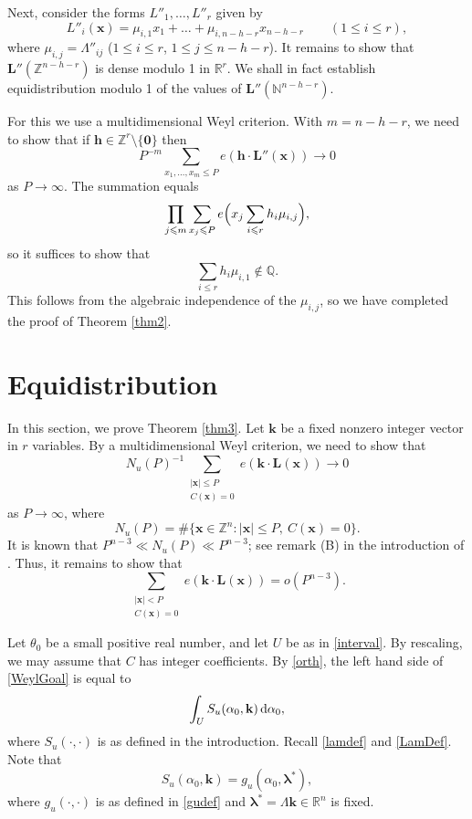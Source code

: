 \documentclass[12pt,reqno]{amsart}
\theoremstyle{definition}
\theoremstyle{remark}
\numberwithin{equation}{section}
\begin{document}
Next, consider the forms $L''_1, \ldots, L''_r$ given by
\[
L''_i({\mathbf x}) = \mu_{i,1} x_1 + \ldots + \mu_{i,n-h-r} x_{n-h-r} \qquad (1 {\leqslant} i {\leqslant} r),
\]
where $\mu_{i,j} = {{\Lambda}}''_{ij}$ ($1 {\leqslant} i {\leqslant} r$, $1 {\leqslant} j {\leqslant} n-h-r$). It remains to show that ${\mathbf L}''({\mathbb Z}^{n-h-r})$ is dense modulo 1 in ${\mathbb R}^r$. We shall in fact establish equidistribution modulo 1 of the values of ${\mathbf L}''({\mathbb N}^{n-h-r})$.

For this we use a multidimensional Weyl criterion. With $m=n-h-r$, we need to show that if ${\mathbf h} \in {\mathbb Z}^r \setminus \{{\mathbf 0}\}$ then
\[
P^{-m} \sum_{x_1, \ldots, x_m {\leqslant} P} e( {\mathbf h} \cdot {\mathbf L}''({\mathbf x})) \to 0
\]
as $P \to \infty$. The summation equals
\[
\prod_{j {\leqslant} m} \sum_{x_j {\leqslant} P} e \Bigl( x_j \sum_{i {\leqslant} r} h_i \mu_{i,j} \Bigr),
\]
so it suffices to show that
\[
\sum_{i {\leqslant} r} h_i \mu_{i,1} \notin {\mathbb Q}.
\]
This follows from the algebraic independence of the $\mu_{i,j}$, so we have completed the proof of Theorem \ref{thm2}.

\section{Equidistribution}
\label{equidistribution}

In this section, we prove Theorem \ref{thm3}. Let ${\mathbf k}$ be a fixed nonzero integer vector in $r$ variables. By a multidimensional Weyl criterion, we need to show that
\[
N_u(P)^{-1} \sum_{\substack{|{\mathbf x}| {\leqslant} P \\ C({\mathbf x}) = 0}} e({\mathbf k} \cdot {\mathbf L}({\mathbf x})) \to 0
\]
as $P \to \infty$, where
\[
N_u(P) = \# \{{\mathbf x} \in {\mathbb Z}^n: |{\mathbf x}| {\leqslant} P, \: C({\mathbf x}) = 0 \}.
\]
It is known that $P^{n-3} \ll N_u(P) \ll P^{n-3}$; see remark (B) in the introduction of \cite{Sch1985}. Thus, it remains to show that
\begin{equation} \label{WeylGoal}
\sum_{\substack{|{\mathbf x}| < P \\ C({\mathbf x}) = 0}} e({\mathbf k} \cdot {\mathbf L}({\mathbf x})) = o(P^{n-3}).
\end{equation}

Let ${{\theta}}_0$ be a small positive real number, and let $U$ be as in \eqref{interval}. By rescaling, we may assume that $C$ has integer coefficients. By \eqref{orth}, the left hand side of \eqref{WeylGoal} is equal to
\[
\int_U S_u({{\alpha}}_0, {\mathbf k}) {{\,{\rm d}}} {{\alpha}}_0,
\]
where $S_u(\cdot, \cdot)$ is as defined in the introduction. Recall \eqref{lamdef} and \eqref{LamDef}. Note that
\[
S_u({{\alpha}}_0,{\mathbf k}) = g_u({{\alpha}}_0, {{\boldsymbol {{\lambda}}}}^*),
\]
where $g_u(\cdot, \cdot)$ is as defined in \eqref{gudef} and ${{\boldsymbol {{\lambda}}}}^* = {{\Lambda}} {\mathbf k} \in {\mathbb R}^n$ is fixed.
\end{document}
